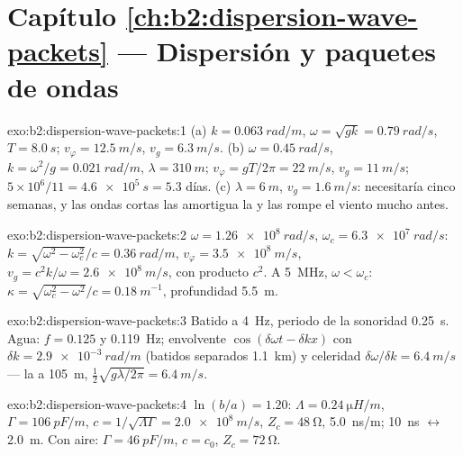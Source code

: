 \section*{Capítulo \ref{ch:b2:dispersion-wave-packets} --- Dispersión y paquetes de ondas}

\begin{solution}{exo:b2:dispersion-wave-packets:1}
(a) $k = \qty{0.063}{rad/m}$, $\omega = \sqrt{gk} = \qty{0.79}{rad/s}$, $T = \qty{8.0}{s}$;
$v_\varphi = \qty{12.5}{m/s}$, $v_g = \qty{6.3}{m/s}$. (b) $\omega = \qty{0.45}{rad/s}$, $k = \omega^2
/g = \qty{0.021}{rad/m}$, $\lambda = \qty{310}{m}$; $v_\varphi = gT/2\pi = \qty{22}{m/s}$, $v_g =
\qty{11}{m/s}$; $5 \times 10^6/11 = \qty{4.6e5}{s} = 5.3$ días. (c) $\lambda = \qty{6}{m}$, $v_g
= \qty{1.6}{m/s}$: necesitaría cinco semanas, y las ondas cortas las
amortigua la  y las rompe el viento mucho antes.
\end{solution}

\begin{solution}{exo:b2:dispersion-wave-packets:2}
$\omega = \qty{1.26e8}{rad/s}$, $\omega_c = \qty{6.3e7}{rad/s}$: $k = \sqrt{\omega^2 - \omega_c^2}/c =
\qty{0.36}{rad/m}$, $v_\varphi = \qty{3.5e8}{m/s}$, $v_g = c^2k/\omega = \qty{2.6e8}{m/s}$,
con producto $c^2$. A \qty{5}{MHz}, $\omega < \omega_c$: $\kappa = \sqrt{\omega_c^2 - \omega^2}/c =
\qty{0.18}{m^{-1}}$, profundidad \qty{5.5}{m}.
\end{solution}

\begin{solution}{exo:b2:dispersion-wave-packets:3}
Batido a \qty{4}{Hz}, periodo de la sonoridad \qty{0.25}{s}. Agua: $f = 0.125$ y
\qty{0.119}{Hz}; envolvente $\cos(\delta\omega t - \delta kx)$ con $\delta k = \qty{2.9e-3}{rad/m}$
(batidos separados \qty{1.1}{km}) y celeridad $\delta\omega/\delta k = \qty{6.4}{m/s}$ --- la
 a \qty{105}{m}, $\tfrac12\sqrt{g\lambda/2\pi} = \qty{6.4}{m/s}$.
\end{solution}

\begin{solution}{exo:b2:dispersion-wave-packets:4}
$\ln(b/a) = 1.20$: $\Lambda = \qty{0.24}{\micro H/m}$, $\Gamma = \qty{106}{pF/m}$, $c = 1/
\sqrt{\Lambda\Gamma} = \qty{2.0e8}{m/s}$, $Z_c = \qty{48}{\ohm}$, \qty{5.0}{ns/m}; \qty{10}{ns}
$\leftrightarrow$ \qty{2.0}{m}. Con aire: $\Gamma = \qty{46}{pF/m}$, $c = c_0$, $Z_c = \qty{72}{\ohm}$.
\end{solution}

